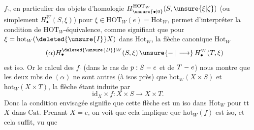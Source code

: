 $f_!$, en particulier des objets d'homologie $H_{\unsure{\bullet|0}}^{\mathrm{HOT}_W}(S,\unsure{\xi|\zeta})$ (ou simplement $H_{\bullet}^W(S,\xi)$) pour $\xi\in\mathrm{HOT}_W(e)=\mathrm{Hot}_W$, permet d'interpréter  la condition de $\mathrm{HOT}_W$-équivalence, comme signifiant que pour  $\xi=\mathrm{hot}_W(\deleted{\unsure{I}}X)$ dans $\mathrm{Hot}_W$, la  flèche canonique  $\mathrm{Hot}_W$
\begingroup
\makeatletter
\tagsleft@true
\makeatother
\[
\tag*{$(\alpha)$}
H_{\bullet}^{\deleted{\unsure{D}}W}(S,\xi)\,\unsure{\relbar|\longrightarrow}\,H_{\bullet}^{W}(T,\xi)
\]
\endgroup
est iso. Or le calcul des $f_!$ (dans le cas de $p:S\relbar e$ et de $T\relbar e$) nous montre que les deux mbs de $(\alpha)$ ne sont autres  (à isos près) que $\mathrm{hot}_W(X\times S)$ et $\mathrm{hot}_W(X\times T)$, la flèche étant induite par
\begingroup
\makeatletter
\tagsleft@true
\makeatother
\[
\mathrm{id}_X\times f:X\times S\longrightarrow X\times T .
\tag*{$(\alpha)$}
\]
\endgroup
Donc la condition envisagée signifie que cette flèche est un iso dans $\mathrm{Hot}_W$ pour tt $X$ dans $\mathrm{Cat}$. Prenant $X=e$, on voit que cela implique que $\mathrm{hot}_W(f)$ est iso, et cela suffit, vu que 
